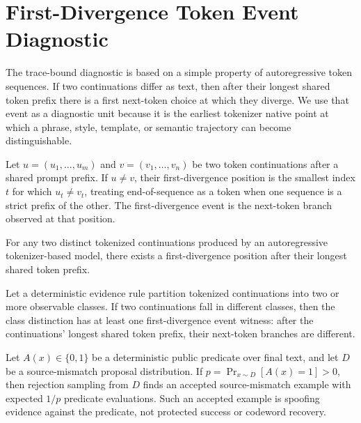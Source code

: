 \section{First-Divergence Token Event Diagnostic}
\label{sec:alignment}

The trace-bound diagnostic is based on a simple property of autoregressive
token sequences.  If two continuations differ as text, then after their longest
shared token prefix there is a first next-token choice at which they diverge.
We use that event as a diagnostic unit because it is the earliest tokenizer
native point at which a phrase, style, template, or semantic trajectory can
become distinguishable.

\begin{definition}
Let $u=(u_1,\ldots,u_m)$ and $v=(v_1,\ldots,v_n)$ be two token continuations
after a shared prompt prefix.  If $u\neq v$, their first-divergence position is
the smallest index $t$ for which $u_t\neq v_t$, treating end-of-sequence as a
token when one sequence is a strict prefix of the other.  The first-divergence
event is the next-token branch observed at that position.
\end{definition}

\begin{lemma}
\label{lem:first-divergence}
For any two distinct tokenized continuations produced by an autoregressive
tokenizer-based model, there exists a first-divergence position after their
longest shared token prefix.
\end{lemma}

\begin{proposition}
\label{prop:first-divergence-reduction}
Let a deterministic evidence rule partition tokenized continuations into two
or more observable classes.  If two continuations fall in different classes,
then the class distinction has at least one first-divergence event witness:
after the continuations' longest shared token prefix, their next-token branches
are different.
\end{proposition}

\begin{proposition}
\label{prop:public-predicate-spoofability}
Let $A(x)\in\{0,1\}$ be a deterministic public predicate over final text, and
let $D$ be a source-mismatch proposal distribution.  If
$p=\Pr_{x\sim D}[A(x)=1]>0$, then rejection sampling from $D$ finds an
accepted source-mismatch example with expected $1/p$ predicate evaluations.
Such an accepted example is spoofing evidence against the predicate, not
protected success or codeword recovery.
\end{proposition}

